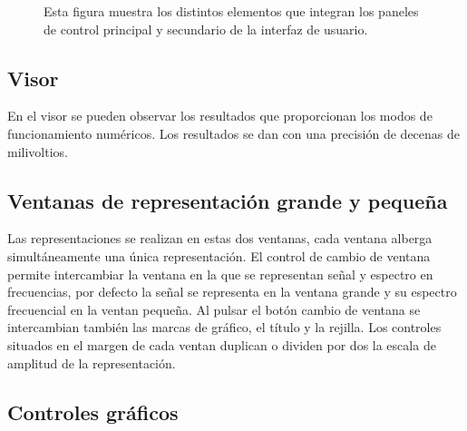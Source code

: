 \begin{figure}
    \begin{center}
    \end{center}
    \caption[Paneles de control de la interfaz de usuario]{Esta figura
    muestra los distintos elementos que integran los paneles de control
    principal y secundario de la interfaz de usuario.}
    \label{fig:controlpanels}
\end{figure}

\subsection{Visor}

En el visor se pueden observar los resultados que proporcionan los modos de
funcionamiento numéricos. Los resultados se dan con una precisión de
decenas de milivoltios.


\subsection{Ventanas de representación grande y
pequeña}\label{subsec:windows}

Las representaciones se realizan en estas dos ventanas, cada ventana
alberga simultáneamente una única representación. El control de cambio de
ventana permite intercambiar la ventana en la que se representan señal y
espectro en frecuencias, por defecto la señal se representa en la ventana
grande y su espectro frecuencial en la ventan pequeña. Al pulsar el botón
cambio de ventana se intercambian también las marcas de gráfico, el título
y la rejilla. Los controles situados en el margen de cada ventan duplican o
dividen por dos la escala de amplitud de la representación.

\subsection{Controles gráficos}\label{subsec:gfoptions}

